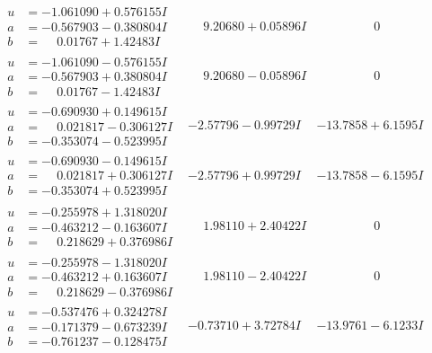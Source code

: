 \documentclass[1p]{elsarticle_modified}
\theoremstyle{definition}
\begin{document}
$$\begin{array}{c|c|c}
\begin{aligned}
u &= -1.061090 + 0.576155 I \\
a &= -0.567903 - 0.380804 I \\
b &= \phantom{-}0.01767 + 1.42483 I\end{aligned}
 & \phantom{-}9.20680 + 0.05896 I & \phantom{-0.000000 } 0 \\ \hline\begin{aligned}
u &= -1.061090 - 0.576155 I \\
a &= -0.567903 + 0.380804 I \\
b &= \phantom{-}0.01767 - 1.42483 I\end{aligned}
 & \phantom{-}9.20680 - 0.05896 I & \phantom{-0.000000 } 0 \\ \hline\begin{aligned}
u &= -0.690930 + 0.149615 I \\
a &= \phantom{-}0.021817 - 0.306127 I \\
b &= -0.353074 - 0.523995 I\end{aligned}
 & -2.57796 - 0.99729 I & -13.7858 + 6.1595 I \\ \hline\begin{aligned}
u &= -0.690930 - 0.149615 I \\
a &= \phantom{-}0.021817 + 0.306127 I \\
b &= -0.353074 + 0.523995 I\end{aligned}
 & -2.57796 + 0.99729 I & -13.7858 - 6.1595 I \\ \hline\begin{aligned}
u &= -0.255978 + 1.318020 I \\
a &= -0.463212 - 0.163607 I \\
b &= \phantom{-}0.218629 + 0.376986 I\end{aligned}
 & \phantom{-}1.98110 + 2.40422 I & \phantom{-0.000000 } 0 \\ \hline\begin{aligned}
u &= -0.255978 - 1.318020 I \\
a &= -0.463212 + 0.163607 I \\
b &= \phantom{-}0.218629 - 0.376986 I\end{aligned}
 & \phantom{-}1.98110 - 2.40422 I & \phantom{-0.000000 } 0 \\ \hline\begin{aligned}
u &= -0.537476 + 0.324278 I \\
a &= -0.171379 - 0.673239 I \\
b &= -0.761237 - 0.128475 I\end{aligned}
 & -0.73710 + 3.72784 I & -13.9761 - 6.1233 I \\ \hline\begin{aligned}

\end{aligned}
\end{array}$$
\end{document}
